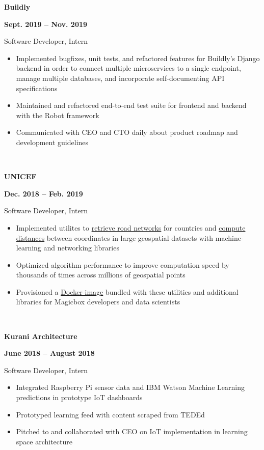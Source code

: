 \documentclass[letterpaper, 10.5pt]{article}
\newcommand{\expentry}[5]{

    \begin{minipage}[b]{0.5\textwidth}
        \raggedright
        \bf\large #3
        \end{minipage}%
        \begin{minipage}[b]{0.5\textwidth}
        \raggedleft
        \bf {#1} -- {#2}
        \end{minipage}

    \begin{minipage}[t]{\linewidth}
    \vspace{-3mm}
    #4
    \vspace{-1.75mm}
    \small{#5}
    \end{minipage}\\
    \vspace{1mm}
    }
\begin{document}
    
    \expentry{Sept. 2019}
    {Nov. 2019}
    {Buildly}
    {Software Developer, Intern}
    {
        \begin{itemize}
          \setlength\itemsep{-0.5mm}
          \item Implemented bugfixes, unit tests, and refactored features for Buildly's Django backend in order to connect multiple microservices to a single endpoint, manage multiple databases, and incorporate self-documenting API specifications
          \item Maintained and refactored end-to-end test suite for frontend and backend with the Robot framework
          \item Communicated with CEO and CTO daily about product roadmap and development guidelines
        \end{itemize}
        
    }


    \expentry{Dec. 2018}
    {Feb. 2019}
    {UNICEF}
    {Software Developer, Intern}
    {

        \begin{itemize}{\leftmargin=0.5em \itemindent=0em}
          \setlength\itemsep{-0.5mm}
          \item Implemented utilites to \href{https://github.com/unicef/magicbox-download-roads}{retrieve road networks} for countries and \href{https://github.com/msradam/magicbox-site-routing}{compute distances} between coordinates in large geospatial datasets with machine-learning and networking libraries
          \item Optimized algorithm performance to improve computation speed by thousands of times across millions of geospatial points
          \item Provisioned a \href{https://hub.docker.com/r/msradam/magicbox-tools}{Docker image} bundled with these utilities and additional libraries for Magicbox developers and data scientists
        \end{itemize}
        
    }

    \expentry{June 2018}
    {August 2018}
    {Kurani Architecture}
    {Software Developer, Intern}
    {\begin{itemize}
          \setlength\itemsep{-0.5mm}
          \item Integrated Raspberry Pi sensor data and IBM Watson Machine Learning predictions in prototype IoT dashboards
          \item Prototyped learning feed with content scraped from TEDEd
          \item Pitched to and collaborated with CEO on IoT implementation in learning space architecture 
        \end{itemize}
    }
\end{document}
